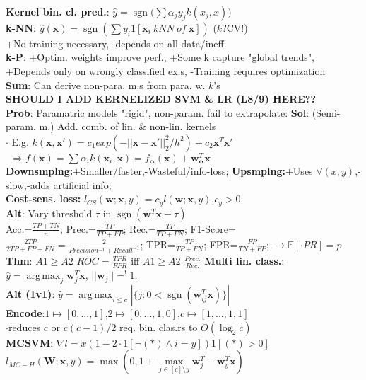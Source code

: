 \documentclass[11pt]{article}
\newcommand{\bv}[1]{\mathbf{#1}}
\newcommand{\E}{\mathbb{E}}
\DeclareMathOperator*{\argmax}{arg\,max}
\DeclareMathOperator*{\sgn}{sgn}
\begin{document}
\begin{multicols}{4}
\textbf{Kernel bin. cl. pred.}: $\hat{y}=\sgn\big(\sum\alpha_j y_j k(x_j,x)\big)$\\
\textbf{k-NN}: $\hat{y}(\bv{x})=\sgn(\sum y_i 1[\bv{x}_i\ kNN\ of\ \bv{x}])$ ($k$?CV!)\\
+No training necessary, -depends on all data/ineff.\\
\textbf{k-P}: +Optim. weights improve perf., +Some k capture "global trends", +Depends only on wrongly classified ex.s, -Training requires optimization\\
\textbf{Sum}: Can derive non-para. m.s from para. w. $k$'s\\
\textbf{SHOULD I ADD KERNELIZED SVM \& LR (L8/9) HERE??}\\
\textbf{Prob}: Paramatric models "rigid", non-param. fail to extrapolate:
\textbf{Sol}: (Semi-param. m.) Add. comb. of lin. \& non-lin. kernels\\
$\cdot$ E.g. $k(\bv{x},\bv{x}')=c_1 exp(-||\bv{x}-\bv{x}'||^2_2/h^2)+c_2\bv{x}^T\bv{x}'$\\
$\ \ \Rightarrow f(\bv{x})=\sum\alpha_i k(\bv{x}_i,\bv{x})=f_\bv{\alpha}(\bv{x})+\bv{w}_\bv{\alpha}^T\bv{x}$\\
\textbf{Downsmplng:}+Smaller/faster,-Wasteful/info-loss;
\textbf{Upsmplng:}+Uses $\forall(x,y)$,-slow,-adds artificial info;\\
\textbf{Cost-sens. loss:} $l_{CS}(\bv{w};\bv{x},y)=c_y l(\bv{w};\bv{x},y)$,$c_y>0.$\\
\textbf{Alt}: Vary threshold $\tau$ in $\sgn(\bv{w}^T\bv{x}-\tau)$\\
Acc.=$\frac{TP+TN}{n}$; Prec.=$\frac{TP}{TP+FP}$;
Rec.=$\frac{TP}{TP+FN}$; F1-Score=$\frac{2TP}{2TP+FP+FN}=\frac{2}{Precision^{-1}+Recall^{-1}}$; TPR=$\frac{TP}{TP+FN}$; FPR=$\frac{FP}{TN+FP}$; $\rightarrow\E[\cdot PR]=p$\\
\textbf{Thm}: $A1\geq A2$ $ROC=\frac{TPR}{FPR}$ iff $A1\geq A2$  $\frac{Prec.}{Rec.}$
\textbf{Multi lin. class.}: $\hat{y}=\argmax_j\bv{w}_j^T\bv{x}$, $||\bv{w}_j||=^!1$.\\
\textbf{Alt (1v1)}: $\hat{y}=\argmax_{i\leq c}|\{j:0<\sgn(\bv{w}_{ij}^T\bv{x}) \}|$\\
\textbf{Encode}:$1\mapsto [0,...,1]$,$2\mapsto [0,...,1,0]$,$c\mapsto [1,...,1,1]$\\
$\cdot$reduces $c$ or $c(c-1)/2$ req. bin. clas.rs to $O(\log_2 c)$\\
\textbf{MCSVM}: $\nabla l = x(1-2\cdot 1[\neg(*)\wedge i=y])1[(*)> 0]$ $l_{MC-H}(\bv{W};\bv{x},y)=\max(0,1+\max\limits_{j\in[c]\setminus y} \bv{w}^T_j-\bv{w}_y^T\bv{x})$\\

\end{multicols}
\end{document}
